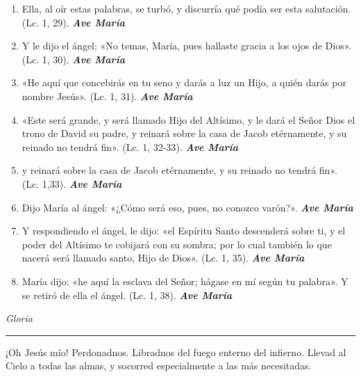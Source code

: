 \documentclass[a4paper,11pt, oneside]{report}
\begin{document}
{{\begin{enumerate}
      \item Ella, al oír estas palabras, se turbó, y discurría qué podía ser esta salutación. (Lc. 1, 29). \textbf{\textit{Ave María}}

      \item Y le dijo el ángel: «No temas, María, pues hallaste gracia a los ojos de Dios». (Lc. 1, 30). \textbf{\textit{Ave María}}

      \item «He aquí que concebirás en tu seno y darás a luz un Hijo, a quién darás por nombre Jesús». (Lc. 1, 31). \textbf{\textit{Ave María}}

      \item «Este será grande, y será llamado Hijo del Altísimo, y le dará el Señor Dios el trono de David su padre, 
      y reinará sobre la casa de Jacob etérnamente, y su reinado no tendrá fin». (Lc. 1, 32-33). \textbf{\textit{Ave María}}

      \item y reinará sobre la casa de Jacob etérnamente, y su reinado no tendrá fin». (Lc. 1,33). \textbf{\textit{Ave María}}

      \item Dijo María al ángel: «¿Cómo será eso, pues, no conozco varón?». \textbf{\textit{Ave María}}

      \item Y respondiendo el ángel, le dijo: «el Espíritu Santo descenderá sobre ti, 
      y el poder del Altísimo te cobijará con su sombra; por lo cual también lo que nacerá será llamado santo, Hijo de Dios». (Lc. 1, 35). \textbf{\textit{Ave María}}

      \item María dijo: «he aquí la esclava del Señor; hágase en mí según tu palabra». Y se retiró de ella el ángel. (Lc. 1, 38). \textbf{\textit{Ave María}}
    \end{enumerate}
      
    \indent\textit{Gloria}

    \begin{center}\rule{1\linewidth}{\linethickness}\end{center}

    \hypertarget{finalAnunciacion}{¡Oh Jesús mío! Perdonadnos. Libradnos del fuego enterno del infierno. Llevad al Cielo a todas las almas, y socorred especialmente a las más 
    necesitadas.}
  }

}
\end{document}

